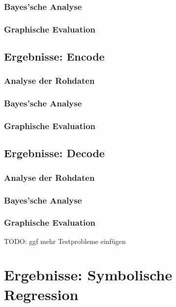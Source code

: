\subsubsection{Bayes'sche Analyse}
\label{parity:bayes}
\subsubsection{Graphische Evaluation}
\label{parity: graphische Evaluation}

\subsection{Ergebnisse: Encode}
\label{subsec:ergebnisseEncode}
\subsubsection{Analyse der Rohdaten}
\label{encode:analyseRohdaten}
\subsubsection{Bayes'sche Analyse}
\label{encode:bayes}
\subsubsection{Graphische Evaluation}
\label{encode: graphische Evaluation}


\subsection{Ergebnisse: Decode}
\label{subsec:ergebnisseDecode}
\subsubsection{Analyse der Rohdaten}
\label{decode:analyseRohdaten}
\subsubsection{Bayes'sche Analyse}
\label{decode:bayes}
\subsubsection{Graphische Evaluation}
\label{decode: graphische Evaluation}

TODO: ggf mehr Testprobleme einfügen

\section{Ergebnisse: Symbolische Regression}
\label{sec:ergebnisseSR}

